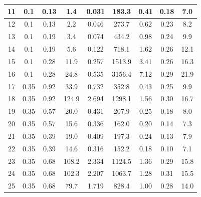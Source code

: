 \begin{table}[!h]
\begin{tabular}{|c|c|c|c|c|c|c||c|c|}
11       & 0.1      & 0.13       & 1.4         &  0.031                &  183.3         & 0.41          & 0.18      & 7.0          \\ \hline
12       & 0.1      & 0.13       & 2.2         &  0.046                &  273.7         & 0.62          & 0.23      & 8.2          \\ \hline
13       & 0.1      & 0.19       & 3.4         &  0.074                &  434.2         & 0.98          & 0.24      & 9.9          \\ \hline
14       & 0.1      & 0.19       & 5.6         &  0.122                &  718.1         & 1.62          & 0.26      & 12.1          \\ \hline
15       & 0.1      & 0.28       & 11.9        &  0.257                &  1513.9        & 3.41          & 0.26      & 16.3          \\ \hline
16       & 0.1      & 0.28       & 24.8        &  0.535                &  3156.4        & 7.12          & 0.29      & 21.9          \\ \hline
17       & 0.35     & 0.92       & 33.9        &  0.732                &  352.8         & 0.43          & 0.25      & 9.9          \\ \hline
18       & 0.35     & 0.92       & 124.9       &  2.694                &  1298.1        & 1.56          & 0.30      & 16.7          \\ \hline
19       & 0.35     & 0.57       & 20.0        &  0.431                &  207.9         & 0.25          & 0.18      & 8.0          \\ \hline
20       & 0.35     & 0.57       & 15.6        &  0.336                &  162.0         & 0.20          & 0.14      & 7.3          \\ \hline
21       & 0.35     & 0.39       & 19.0        &  0.409                &  197.3         & 0.24          & 0.13      & 7.9          \\ \hline
22       & 0.35     & 0.39       & 14.6        &  0.316                &  152.2         & 0.18          & 0.10      & 7.1          \\ \hline
23       & 0.35     & 0.68       & 108.2       &  2.334                &  1124.5        & 1.36          & 0.29      & 15.8          \\ \hline
24       & 0.35     & 0.68       & 102.3       &  2.207                &  1063.7        & 1.28          & 0.31      & 15.5          \\ \hline
25       & 0.35     & 0.68       & 79.7        &  1.719                &  828.4         & 1.00          & 0.28      & 14.0          \\ \hline

\end{tabular}
\end{table}
